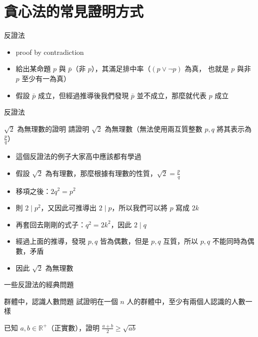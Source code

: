 \documentclass[aspectratio=169]{beamer}
\begin{document}
    \section{貪心法的常見證明方式}

    \begin{frame}{反證法}
        \begin{itemize}
            \item<1-> proof by contradiction
            \item<1-> 給出某命題 $p$ 與 $\bar{p}$（非 $p$），其滿足排中率（${\displaystyle (p\vee \neg p)}$ 為真，
            也就是 $p$ 與非 $p$ 至少有一為真）
            \item<2-> 假設 $\bar{p}$ 成立，但經過推導後我們發現 $\bar{p}$ 並不成立，那麼就代表 $p$ 成立
        \end{itemize}
    \end{frame}

    \begin{frame}{反證法}
        \begin{block}{$\sqrt{2}$ 為無理數的證明}
            請證明 $\sqrt{2}$ 為無理數（無法使用兩互質整數 $p, q$ 將其表示為 $\frac{p}{q}$）
        \end{block}

        \begin{itemize}
            \item<1-> 這個反證法的例子大家高中應該都有學過
            \item<2-> 假設 $\sqrt{2}$ 為有理數，那麼根據有理數的性質，$\sqrt{2} = \frac{p}{q}$
            \item<3-> 移項之後：$2q^2 = p^2$
            \item<4-> 則 $2 \mid p^2$，又因此可推導出 $2 \mid p$，所以我們可以將 $p$ 寫成 $2k$
            \item<5-> 再套回去剛剛的式子：$q^2 = 2k^2$，因此 $2 \mid q$
            \item<6-> 經過上面的推導，發現 $p, q$ 皆為偶數，但是 $p, q$ 互質，所以 $p, q$ 不能同時為偶數，矛盾
            \item<7-> 因此 $\sqrt{2}$ 為無理數
        \end{itemize}
    \end{frame}

    \begin{frame}{一些反證法的經典問題}
        \begin{block}{群體中，認識人數問題}
            試證明在一個 $n$ 人的群體中，至少有兩個人認識的人數一樣
        \end{block}

        \begin{block}
            已知 $a, b \in \mathbb{R}^+$（正實數），證明 $\frac{a + b}{2} \ge \sqrt{ab}$
        \end{block}
    \end{frame}
    
\end{document}
